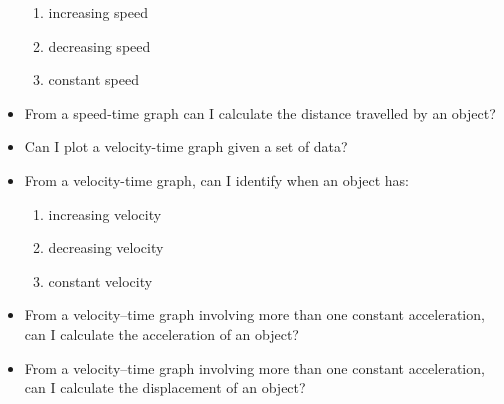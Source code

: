\begin{multicols}{2}
\begin{itemize}
\begin{enumerate}[label=(\alph*)]
				\item increasing speed
				\item decreasing speed
				\item constant speed
			\end{enumerate}
		\item From a speed-time graph can I calculate the distance travelled by an
			object?
		\item Can I plot a velocity-time graph given a set of data?
		\item From a velocity-time graph, can I identify when an object has:
			\begin{enumerate}[label=(\alph*)]
				\item increasing velocity
				\item decreasing velocity
				\item constant velocity
			\end{enumerate}
		\item From a velocity–time graph involving more than one constant
			acceleration, can I calculate the acceleration of an object?
		\item From a velocity–time graph involving more than one constant
			acceleration, can I calculate the displacement of an object?
	\end{itemize}
\end{multicols}

